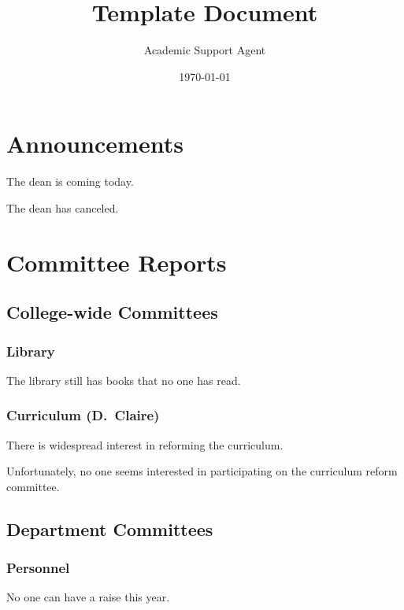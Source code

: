 \documentclass{article}
\title{Template Document}
\author{Academic Support Agent}
\date{\today}
\begin{document}
\maketitle

\maketitle

\section{Announcements}
\begin{hiddenitems}
\item
The dean is coming today.

\item
The dean has canceled.

\end{hiddenitems}

\section{Committee Reports}

\subsection{College-wide Committees}
\subsubsection{Library}
The library still has books that no one has read.

\subsubsection{Curriculum {\rm (D.~Claire)}}
\begin{hiddensubitems}
\item
There is widespread interest in reforming the curriculum.

\item
Unfortunately, no one seems interested in participating on the
curriculum reform committee.
\end{hiddensubitems}

\subsection{Department Committees}
\subsubsection{Personnel}
No one can have a raise this year.
\end{document}
